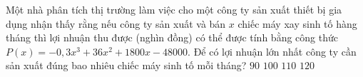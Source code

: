 

\begin{ex}%
	Một nhà phân tích thị trường làm việc cho một công ty sản xuất thiết bị gia dụng nhận thấy rằng nếu công ty sản xuất và bán $x$ chiếc máy xay sinh tố hàng tháng thì lợi nhuận thu được  (nghìn đồng) có thể được tính bằng công thức $P(x)=-0{,}3 x^3 +36x^2 +1800x -48000$. Để có lợi nhuận lớn nhất công ty cần sản xuất đúng bao nhiêu chiếc máy sinh tố mỗi tháng?
	\choice 
		{$90$} 
		{\True $100$} 
		 {$110$}
		 {$120$}
\end{ex}

